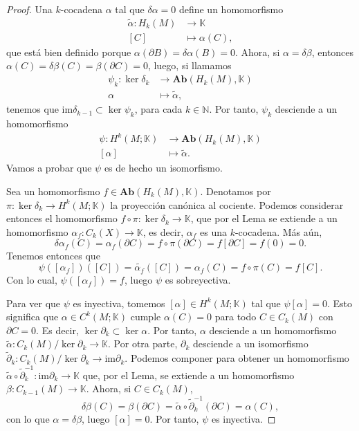 \documentclass[12pt,a4paper]{book}
\theoremstyle{definition} \newtheorem{defn}[thm]{Definición}
\theoremstyle{definition} \newtheorem{ejemplo}[thm]{Ejemplo}
\theoremstyle{definition} \newtheorem{ejercicio}[thm]{Ejercicio}
\theoremstyle{remark} \newtheorem*{obs}{Observación}
\def\KK{\mathbb{K}}
\def\NN{\mathbb{N}}
\def\im{\mathrm{im}}
\begin{document}
\begin{proof}
  Una $k$-cocadena $\alpha$ tal que $\delta \alpha = 0$ define un homomorfismo
  \begin{align*}
    \tilde{\alpha}:H_k(M)&\longrightarrow \KK\\ 
     [C] &\longmapsto \alpha(C),
    \end{align*}
    que está bien definido porque $\alpha(\partial B)=\delta \alpha(B)=0$. Ahora, si $\alpha=\delta \beta$, entonces $\alpha(C)=\delta \beta (C)=\beta (\partial C)=0$, luego, si llamamos
    \begin{align*}
      \psi_k :\ker \delta_k&\longrightarrow \mathbf{Ab}(H_k(M),\KK)\\ 
      \alpha &\longmapsto \tilde{\alpha}, 
      \end{align*}
    tenemos que
    $\im \delta_{k-1} \subset \ker \psi_k$, para cada $k\in \NN$. Por tanto, $\psi_k$ desciende a un homomorfismo 
    \begin{align*}
      \psi :H^k(M;\KK)&\longrightarrow \mathbf{Ab}(H_k(M),\KK)\\ 
      [\alpha] &\longmapsto \tilde{\alpha}. 
      \end{align*}
Vamos a probar que $\psi$ es de hecho un isomorfismo.

Sea un homomorfismo $f\in \mathbf{Ab}(H_k(M),\KK)$. Denotamos por $\pi:\ker \delta_k \rightarrow H^k(M;\KK)$ la proyección canónica al cociente. Podemos considerar entonces el homomorfismo $f\circ \pi: \ker \delta_k \rightarrow \KK$, que por el Lema se extiende a un homomorfismo $\alpha_f:C_k(X)\rightarrow \KK$, es decir, $\alpha_f$ es una $k$-cocadena. Más aún,
\begin{equation*}
  \delta \alpha_f (C)=\alpha_f (\partial C) = f\circ \pi (\partial C) =f [\partial C] = f(0) =0.
\end{equation*}
Tenemos entonces que $$\psi([\alpha_f])([C])=\tilde{\alpha_f}([C])=\alpha_f(C)=f\circ \pi (C)=f[C].$$ Con lo cual, $\psi([\alpha_f])=f$, luego $\psi$ es sobreyectiva. 

Para ver que $\psi$ es inyectiva, tomemos $[\alpha] \in H^k(M; \KK)$ tal que $\psi[\alpha]=0$. Esto significa que $\alpha \in C^k(M; \KK)$ cumple $\alpha(C)=0$ para todo $C\in C_k(M)$ con $\partial C = 0$. Es decir, $\ker \partial_k \subset \ker \alpha$. Por tanto,  $\alpha$ desciende a un homomorfismo $\tilde{\alpha}:C_k(M)/\ker \partial_k \rightarrow \KK$. Por otra parte, $\partial_k$ desciende a un isomorfismo
$\tilde{\partial}_k :C_k(M)/\ker \partial_k\rightarrow \im \partial_k$. Podemos componer para obtener un homomorfismo $\tilde{\alpha}\circ \tilde{\partial}_k^{-1}: \im \partial_k \rightarrow \KK$ que, por el Lema, se extiende a un homomorfismo $\beta:C_{k-1}(M) \rightarrow \KK$. Ahora, si $C\in C_k(M)$,
\begin{equation*}
  \delta \beta(C)=\beta(\partial C)=\tilde{\alpha}\circ \tilde{\partial}_k^{-1}(\partial C)=\alpha(C),
\end{equation*}
con lo que $\alpha = \delta \beta$, luego $[\alpha]=0$. Por tanto, $\psi$ es inyectiva.
\end{proof}
\end{document}
